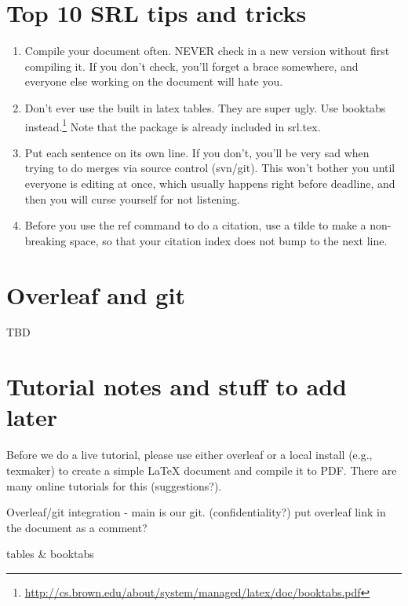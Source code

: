\documentclass{sigchi}
\begin{document}
\section{Top 10 SRL tips and tricks}

\begin{enumerate}

\item
Compile your document often.
NEVER check in a new version without first compiling it.
If you don't check, you'll forget a brace somewhere, and everyone else working on the document will hate you.

\item
Don't ever use the built in latex tables.
They are super ugly.
Use booktabs instead.\footnote{\url{http://cs.brown.edu/about/system/managed/latex/doc/booktabs.pdf}}
Note that the package is already included in srl.tex.

\item
Put each sentence on its own line.
If you don't, you'll be very sad when trying to do merges via source control (svn/git).
This won't bother you until everyone is editing at once, which usually happens right before deadline, and then you will curse yourself for not listening.

\item
Before you use the ref command to do a citation, use a tilde to make a non-breaking space, so that your citation index does not bump to the next line.

\end{enumerate}

\section{Overleaf and git}

TBD

\section{Tutorial notes and stuff to add later}

Before we do a live tutorial, please use either overleaf or a local install (e.g., texmaker) to create a simple LaTeX document and compile it to PDF.
There are many online tutorials for this (suggestions?).

Overleaf/git integration - main is our git. (confidentiality?) put overleaf link in the document as a comment?

tables \& booktabs
\end{document}
